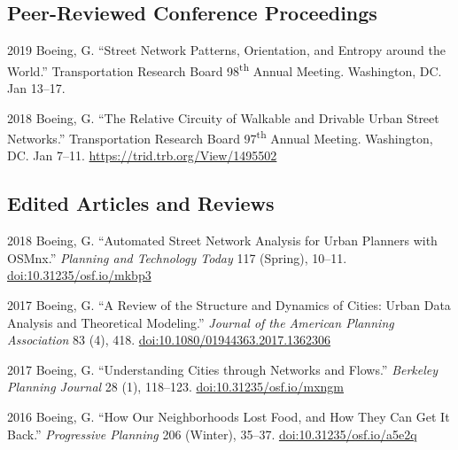 \documentclass[12pt,letterpaper]{report}
\begin{document}
	
	
	\subsection*{Peer-Reviewed Conference Proceedings}
	
	\begin{tablist}
		
		\item[2019] \tab Boeing, G. \enquote{Street Network Patterns, Orientation, and Entropy around the World.} Transportation Research Board 98\textsuperscript{th} Annual Meeting. Washington, DC. Jan 13--17.
		
		\item[2018] \tab Boeing, G. \enquote{The Relative Circuity of Walkable and Drivable Urban Street Networks.} Transportation Research Board 97\textsuperscript{th} Annual Meeting. Washington, DC. Jan 7--11. \href{https://trid.trb.org/View/1495502}{https://trid.trb.org/View/1495502}
		
	\end{tablist}
	
	
	
	\subsection*{Edited Articles and Reviews}
	
	\begin{tablist}
		
		\item[2018] \tab Boeing, G. \enquote{Automated Street Network Analysis for Urban Planners with OSMnx.} \textit{Planning and Technology Today} 117 (Spring), 10--11. \href{https://doi.org/10.31235/osf.io/mkbp3}{doi:10.31235/osf.io/mkbp3}
		
		\item[2017] \tab Boeing, G. \enquote{A Review of the Structure and Dynamics of Cities: Urban Data Analysis and Theoretical Modeling.} \textit{Journal of the American Planning Association} 83 (4), 418. \href{https://doi.org/10.1080/01944363.2017.1362306}{doi:10.1080/01944363.2017.1362306}
		
		\item[2017] \tab Boeing, G. \enquote{Understanding Cities through Networks and Flows.} \textit{Berkeley Planning Journal} 28 (1), 118--123. \href{https://doi.org/10.31235/osf.io/mxngm}{doi:10.31235/osf.io/mxngm}
		
		\item[2016] \tab Boeing, G. \enquote{How Our Neighborhoods Lost Food, and How They Can Get It Back.} \textit{Progressive Planning} 206 (Winter), 35--37. \href{https://doi.org/10.31235/osf.io/a5e2q}{doi:10.31235/osf.io/a5e2q}
		
	\end{tablist}
	
\end{document}
